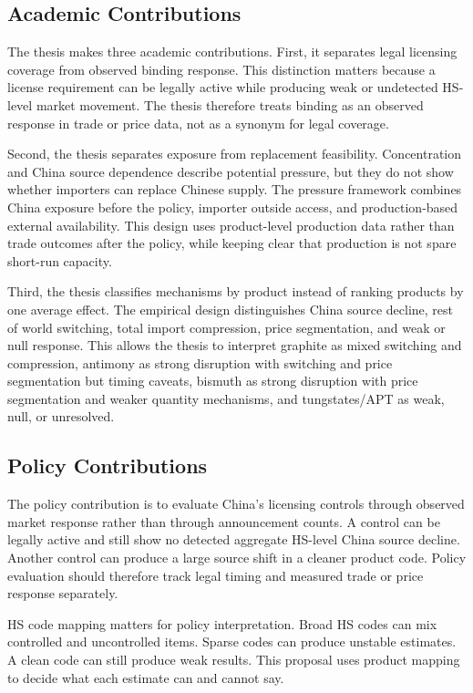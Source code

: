 \documentclass[12pt,a4paper]{article}
\numberwithin{equation}{section}
\begin{document}
\subsection{Academic Contributions}

The thesis makes three academic contributions. First, it separates legal licensing coverage from observed binding response. This distinction matters because a license requirement can be legally active while producing weak or undetected HS-level market movement. The thesis therefore treats binding as an observed response in trade or price data, not as a synonym for legal coverage.

Second, the thesis separates exposure from replacement feasibility. Concentration and China source dependence describe potential pressure, but they do not show whether importers can replace Chinese supply. The pressure framework combines China exposure before the policy, importer outside access, and production-based external availability. This design uses product-level production data rather than trade outcomes after the policy, while keeping clear that production is not spare short-run capacity.

Third, the thesis classifies mechanisms by product instead of ranking products by one average effect. The empirical design distinguishes China source decline, rest of world switching, total import compression, price segmentation, and weak or null response. This allows the thesis to interpret graphite as mixed switching and compression, antimony as strong disruption with switching and price segmentation but timing caveats, bismuth as strong disruption with price segmentation and weaker quantity mechanisms, and tungstates/APT as weak, null, or unresolved.

\subsection{Policy Contributions}

The policy contribution is to evaluate China's licensing controls through observed market response rather than through announcement counts. A control can be legally active and still show no detected aggregate HS-level China source decline. Another control can produce a large source shift in a cleaner product code. Policy evaluation should therefore track legal timing and measured trade or price response separately.

HS code mapping matters for policy interpretation. Broad HS codes can mix controlled and uncontrolled items. Sparse codes can produce unstable estimates. A clean code can still produce weak results. This proposal uses product mapping to decide what each estimate can and cannot say.
\end{document}
